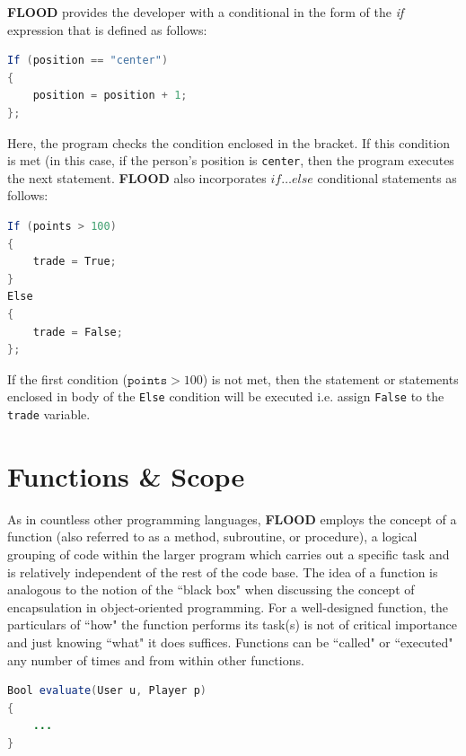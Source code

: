 \documentclass[12pt]{report}
\begin{document}
\textbf{FLOOD} provides the developer with a conditional in the form of the \textit{if} expression that is defined as follows:

\begin{singlespace}
\begin{lstlisting}[language=Java,label=some-code,caption={\textit{If} conditional}]
If (position == "center")
{
	position = position + 1;
};
\end{lstlisting}
\end{singlespace}

Here, the program checks the condition enclosed in the bracket. If this condition is met (in this case, if the person's position is \texttt{center}, then the program executes the next statement. \textbf{FLOOD} also incorporates \textit{$if\ldots else$} conditional statements as follows:

\begin{singlespace}
\begin{lstlisting}[language=Java,label=some-code,caption={\textit{If\ldots Else} conditional statement.}]
If (points > 100)
{
	trade = True;
}
Else
{
	trade = False;
};	
\end{lstlisting}
\end{singlespace}

If the first condition ($\texttt{points} > 100$) is not met, then the statement or statements enclosed in body of the \texttt{Else} condition will be executed i.e. assign \texttt{False} to the \texttt{trade} variable.

\section{Functions \& Scope}

As in countless other programming languages, \textbf{FLOOD} employs the concept of a function (also referred to as a method, subroutine, or procedure), a logical grouping of code within the larger program which carries out a specific task and is relatively independent of the rest of the code base. The idea of a function is analogous to the notion of the ``black box" when discussing the concept of encapsulation in object-oriented programming. For a well-designed function, the particulars of ``how" the function performs its task(s) is not of critical importance and just knowing ``what" it does suffices. Functions can be ``called" or ``executed" any number of times and from within other functions. 

\begin{singlespace}
\begin{lstlisting}[language=Java,label=some-code,caption={Syntax of a FLOOD function.}]
Bool evaluate(User u, Player p)
{
	...
} 
\end{lstlisting}
\end{singlespace}
\end{document}
